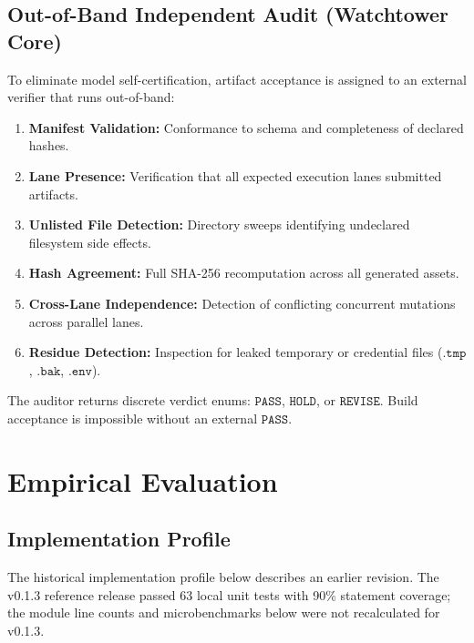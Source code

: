 \documentclass[11pt,a4paper]{article}
\begin{document}
\subsection{Out-of-Band Independent Audit (Watchtower Core)}
To eliminate model self-certification, artifact acceptance is assigned to an external verifier that runs out-of-band:
\begin{enumerate}
    \item \textbf{Manifest Validation:} Conformance to schema and completeness of declared hashes.
    \item \textbf{Lane Presence:} Verification that all expected execution lanes submitted artifacts.
    \item \textbf{Unlisted File Detection:} Directory sweeps identifying undeclared filesystem side effects.
    \item \textbf{Hash Agreement:} Full SHA-256 recomputation across all generated assets.
    \item \textbf{Cross-Lane Independence:} Detection of conflicting concurrent mutations across parallel lanes.
    \item \textbf{Residue Detection:} Inspection for leaked temporary or credential files ($\mathtt{.tmp}$, $\mathtt{.bak}$, $\mathtt{.env}$).
\end{enumerate}
The auditor returns discrete verdict enums: $\mathtt{PASS}$, $\mathtt{HOLD}$, or $\mathtt{REVISE}$. Build acceptance is impossible without an external $\mathtt{PASS}$.

\section{Empirical Evaluation}

\subsection{Implementation Profile}
The historical implementation profile below describes an earlier revision. The v0.1.3 reference release passed 63 local unit tests with 90\% statement coverage; the module line counts and microbenchmarks below were not recalculated for v0.1.3.
\end{document}
